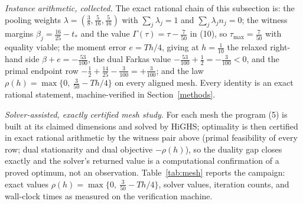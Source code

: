 \documentclass[10pt,twocolumn]{article}
\theoremstyle{plain}
\theoremstyle{definition}
\theoremstyle{remark}
\begin{document}
\emph{Instance arithmetic, collected.} The exact rational chain of this
subsection is: the pooling weights
\(\lambda = (\tfrac38, \tfrac5{16}, \tfrac5{16})\) with
\(\sum_j \lambda_j = 1\) and \(\sum_j \lambda_j n_j = 0\); the
witness margins \(\beta_j = \tfrac{16}{25} - t_*\) and the value
\(\Gamma(\tau) = \tau - \tfrac7{50}\) in (10), so
\(\tau_{\max} = \tfrac7{50}\) with equality viable; the moment error
\(e = Th/4\), giving at \(h = \tfrac1{10}\) the relaxed right-hand
side \(\beta + e = -\tfrac{53}{100}\), the dual Farkas value
\(-\tfrac{53}{100} + \tfrac12 = -\tfrac3{100} < 0\), and the primal
endpoint row \( -\tfrac12 + \tfrac{14}{25} - \tfrac3{100} =
+\tfrac3{100}\); and the law \(\rho(h) = \max\{0,\
\tfrac3{50} - Th/4\}\) on every aligned mesh. Every identity is an
exact rational statement, machine-verified in
Section~\ref{methods}.

\emph{Solver-assisted, exactly certified mesh study.} For each mesh the
program (5) is built
at its claimed dimensions and solved by HiGHS; optimality is then certified
in exact rational arithmetic by the witness pair above (primal feasibility of
every row; dual stationarity and dual objective \(-\rho(h)\)), so the duality
gap closes exactly and the solver's returned value is a computational
confirmation of a proved optimum, not an observation.
Table~\ref{tab:mesh} reports the campaign: exact values
\(\rho(h) = \max\{0,\ \tfrac{3}{50} - Th/4\}\), solver values, iteration
counts, and wall-clock times as measured on the verification machine.
\end{document}
